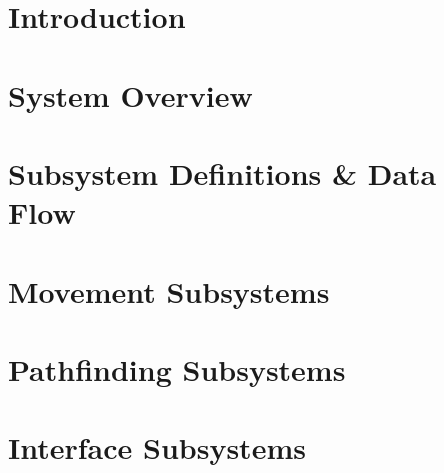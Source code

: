 \documentclass[11pt,letterpaper]{article}
\begin{document}
\setcounter{tocdepth}{2}
\tableofcontents
\newpage

\listoffigures
\listoftables
\newpage

\section{Introduction}

\newpage
\section{System Overview}

\newpage
\section{Subsystem Definitions \& Data Flow}

\newpage
\section{Movement Subsystems}

\newpage
\section{Pathfinding Subsystems}

\newpage
\section{Interface Subsystems}

\newpage

%

{}
\end{document}
